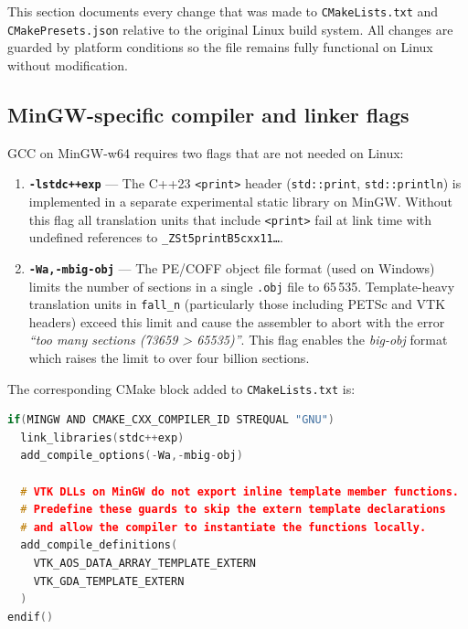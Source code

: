 This section documents every change that was made to \texttt{CMakeLists.txt}
and \texttt{CMakePresets.json} relative to the original Linux build system.
All changes are guarded by platform conditions so the file remains fully
functional on Linux without modification.

\subsection{MinGW-specific compiler and linker flags}

GCC on MinGW-w64 requires two flags that are not needed on Linux:

\begin{enumerate}
  \item \textbf{\texttt{-lstdc++exp}} --- The C++23 \texttt{<print>} header
        (\texttt{std::print}, \texttt{std::println}) is implemented in a
        separate experimental static library on MinGW.  Without this flag all
        translation units that include \texttt{<print>} fail at link time with
        undefined references to \texttt{\_ZSt5printB5cxx11\ldots}.

  \item \textbf{\texttt{-Wa,-mbig-obj}} --- The PE/COFF object file format
        (used on Windows) limits the number of sections in a single
        \texttt{.obj} file to 65\,535.  Template-heavy translation units in
        \texttt{fall\_n} (particularly those including PETSc and VTK headers)
        exceed this limit and cause the assembler to abort with the error
        \emph{``too many sections (73659 > 65535)''}.  This flag enables the
        \emph{big-obj} format which raises the limit to over four billion
        sections.
\end{enumerate}

The corresponding CMake block added to \texttt{CMakeLists.txt} is:
\begin{lstlisting}[language=C++, basicstyle=\ttfamily\small,
    keywordstyle=\bfseries\color{blue!70!black},
    commentstyle=\itshape\color{green!50!black},
    stringstyle=\color{red!60!black},
    frame=single, framerule=0.4pt, rulecolor=\color{gray!50},
    breaklines=true, showstringspaces=false]
if(MINGW AND CMAKE_CXX_COMPILER_ID STREQUAL "GNU")
  link_libraries(stdc++exp)
  add_compile_options(-Wa,-mbig-obj)

  # VTK DLLs on MinGW do not export inline template member functions.
  # Predefine these guards to skip the extern template declarations
  # and allow the compiler to instantiate the functions locally.
  add_compile_definitions(
    VTK_AOS_DATA_ARRAY_TEMPLATE_EXTERN
    VTK_GDA_TEMPLATE_EXTERN
  )
endif()
\end{lstlisting}


